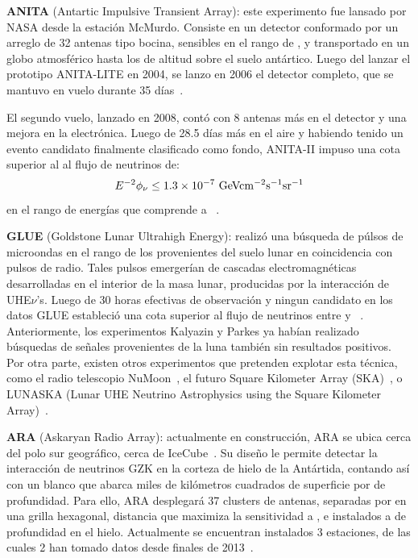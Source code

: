 	\textbf{ANITA} (Antartic Impulsive Transient Array): este experimento fue lansado por NASA desde la estaci\'on McMurdo. 
	Consiste en un detector conformado por un arreglo de 32 antenas tipo bocina, sensibles en el rango de , y transportado en un globo atmosf\'erico hasta los  de altitud sobre el suelo ant\'artico.
	Luego del lanzar el prototipo ANITA-LITE en 2004, se lanzo en 2006 el detector completo, que se mantuvo en vuelo durante 35 d\'ias~\cite{cite:Anita1}.
	 
	El segundo vuelo, lanzado en 2008, cont\'o con 8 antenas m\'as en el detector y una mejora en la electr\'onica.
	Luego de 28.5 d\'ias m\'as en el aire y habiendo tenido un evento candidato finalmente clasificado como fondo, ANITA-II impuso una cota superior al  al flujo de neutrinos de:
	\begin{equation}
	 E^{-2}\phi_\nu \leq 1.3\times10^{-7}{\rm\ GeVcm^{-2}s^{-1}sr^{-1}}
	\end{equation}
	en el rango de energ\'ias que comprende  a ~\cite{cite:Anita2}.
	
	\textbf{GLUE} (Goldstone Lunar Ultrahigh Energy): realiz\'o una b\'usqueda de p\'ulsos de microondas en el rango de los  provenientes del suelo lunar en coincidencia con pulsos de radio. 
	Tales pulsos emerger\'ian de cascadas electromagn\'eticas desarrolladas en el interior de la masa lunar, producidas por la interacci\'on de UHE$\nu$'s. 
	Luego de 30 horas efectivas de observaci\'on y ningun candidato en los datos GLUE estableci\'o una cota superior al flujo de neutrinos entre  y ~\cite{cite:Glue}.
	Anteriormente, los experimentos Kalyazin \cite{cite:Kalazin} y Parkes \cite{cite:Parkes} ya hab\'ian realizado b\'usquedas de se\~nales provenientes de la luna tambi\'en sin resultados positivos.
	Por otra parte, existen otros experimentos que pretenden explotar esta t\'ecnica, como el radio telescopio NuMoon~\cite{cite:NuMoon}, el futuro Square Kilometer Array (SKA)~\cite{cite:SKA}, o LUNASKA (Lunar UHE Neutrino Astrophysics using the Square Kilometer Array)~\cite{cite:LUNASKA}.
	
	\textbf{ARA} (Askaryan Radio Array): actualmente en construcci\'on, ARA se ubica cerca del polo sur geogr\'afico, cerca de IceCube~\cite{cite:ARA}.
	Su dise\~no le permite detectar la interacci\'on de neutrinos GZK en la corteza de hielo de la Ant\'artida, contando as\'i con un blanco que abarca miles de kil\'ometros cuadrados de superficie por  de profundidad.
	Para ello, ARA desplegar\'a 37 clusters de antenas, separadas por  en una grilla hexagonal, distancia que maximiza la sensitividad a , e instalados a  de profundidad en el hielo.
	Actualmente se encuentran instalados 3 estaciones, de las cuales 2 han tomado datos desde finales de 2013~\cite{cite:ARA2}.
	
